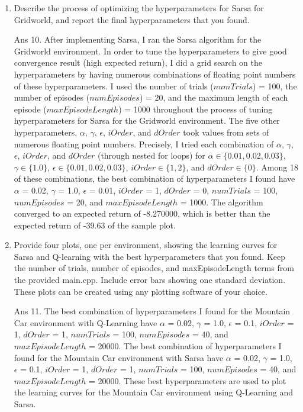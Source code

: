 \documentclass[]{article}
\begin{document}
\begin{enumerate}
    \item Describe the process of optimizing the hyperparameters for Sarsa for Gridworld, and report the final hyperparameters that you found.

	{
		\color{blue}
		Ans 10. After implementing Sarsa, I ran the Sarsa algorithm for the Gridworld environment. In order to tune the hyperparameters to give good convergence result (high expected return), I did a grid search on the hyperparameters by having numerous combinations of floating point numbers of these hyperparameters. I used the number of trials ($numTrials$) = 100, the number of episodes ($numEpisodes$) = 20, and the maximum length of each episode ($maxEpisodeLength$) = 1000 throughout the process of tuning hyperparameters for Sarsa for the Gridworld environment. The five other hyperparameters, $\alpha$, $\gamma$, $\epsilon$, $iOrder$, and $dOrder$ took values from sets of numerous floating point numbers. Precisely, I tried each combination of $\alpha$, $\gamma$, $\epsilon$, $iOrder$, and $dOrder$ (through nested for loops) for $\alpha \in \{0.01, 0.02, 0.03\}$, $\gamma \in \{1.0\}$, $\epsilon \in \{0.01, 0.02, 0.03\}$, $iOrder \in \{1, 2\}$, and $dOrder \in \{0\}$. Among 18 of these combinations, the best combination of hyperparameters I found have $\alpha$ = 0.02, $\gamma$ = 1.0, $\epsilon$ = 0.01, $iOrder$ = 1, $dOrder$ =  0, $numTrials$ = 100, $numEpisodes$ = 20, and $maxEpisodeLength$ = 1000. The algorithm converged to an expected return of -8.270000, which is better than the expected return of -39.63 of the sample plot.

	}

    \item Provide four plots, one per environment, showing the learning curves for Sarsa and Q-learning with the best hyperparameters that you found. Keep the number of trials, number of episodes, and maxEpisodeLength terms from the provided main.cpp. Include error bars showing one standard deviation. These plots can be created using any plotting software of your choice.

	{
		\color{blue}
		Ans 11. The best combination of hyperparameters I found for the Mountain Car environment with Q-Learning have $\alpha$ = 0.02, $\gamma$ = 1.0, $\epsilon$ = 0.1, $iOrder$ = 1, $dOrder$ =  1, $numTrials$ = 100, $numEpisodes$ = 40, and $maxEpisodeLength$ = 20000.
The best combination of hyperparameters I found for the Mountain Car environment with Sarsa have $\alpha$ = 0.02, $\gamma$ = 1.0, $\epsilon$ = 0.1, $iOrder$ = 1, $dOrder$ =  1, $numTrials$ = 100, $numEpisodes$ = 40, and $maxEpisodeLength$ = 20000.
These best hyperparameters are used to plot the learning curves for the Mountain Car environment using Q-Learning and Sarsa.
		
}
\end{enumerate}
\end{document}
